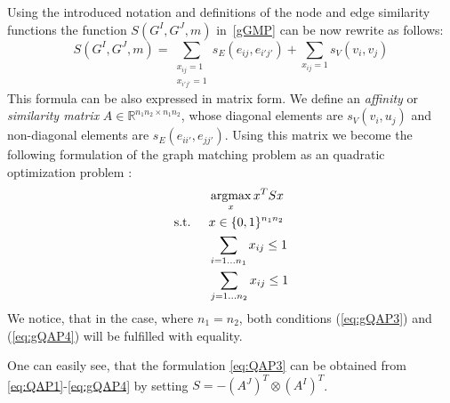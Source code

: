 Using the introduced notation and definitions of the node and edge similarity functions the function $S(G^I,G^J,m)$ in~\eqref{gGMP} can be now rewrite as follows:
\begin{equation}\label{eq:sumQAP}
	S(G^I,G^J,m)=\sum_{\substack{x_{ij}=1\\x_{i'j'}=1}}s_E(e_{ij},e_{i'j'}) + \sum_{x_{ij}=1}s_V(v_{i},v_{j})
\end{equation}
This formula can be also expressed in matrix form. We define an \emph{affinity} or \emph{similarity matrix} $A\in\mathbb{R}^{n_1n_2\times n_1n_2}$, whose diagonal elements are $s_V(v_i, u_j)$ and non-diagonal elements are $s_E(e_{ii\prime}, e_{jj\prime})$. Using this matrix we become the following formulation of the graph matching problem as an quadratic optimization problem \cite{Cho2014_Haystack, Cho2010_RRWM, Cho2012_ProgressiveGM, Conte2004}:
\begin{alignat}{2}
    &     && \argmax_x{x^TSx}                           \label{eq:gQAP1}\\ %
    & \text{s.t. } &&  x\in \{0,1\}^{n_1n_2}            \label{eq:gQAP2}\\
    &             &&  \sum_{i=1\dots n_1} x_{ij}\le 1    \label{eq:gQAP3}\\
    &             &&  \sum_{j=1\dots n_2} x_{ij}\le 1    \label{eq:gQAP4}
\end{alignat}
We notice, that in the case, where $n_1=n_2$, both conditions (\ref{eq:gQAP3}) and (\ref{eq:gQAP4}) will be fulfilled with equality.

One can easily see, that the formulation \eqref{eq:QAP3} can be obtained from \eqref{eq:QAP1}-\eqref{eq:gQAP4} by setting $S=-(A^J)^T\otimes(A^I)^T$.

